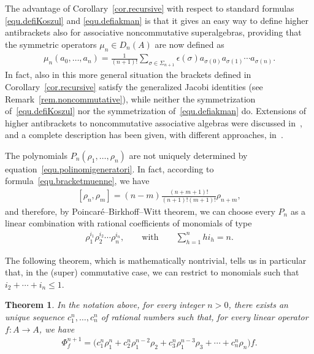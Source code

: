 \documentclass[pdftex]{sigma}
\numberwithin{equation}{section}
\newtheorem{Theorem}{Theorem}[section]
\begin{document}
The advantage of Corollary~\ref{cor.recursive} with respect to standard formulas \eqref{equ.defiKoszul} and
\eqref{equ.defiakman} is that it gives an easy way to def\/ine higher antibrackets
also for associative noncommutative superalgebras, providing that the symmetric operators $\mu_n\in D_n(A)$ are now def\/ined as
\begin{gather*} \mu_n(a_0,\ldots,a_n)=\frac{1}{(n+1)!}\sum_{\sigma\in \Sigma_{n+1}}\epsilon(\sigma)
a_{\sigma(0)}a_{\sigma(1)}\cdots a_{\sigma(n)} .\end{gather*}
In fact, also in this more general situation the brackets def\/ined in Corollary~\ref{cor.recursive}
satisfy the generalized Jacobi identities (see Remark~\ref{rem.noncommutative}),
while neither the symmetrization of~\eqref{equ.defiKoszul} nor the symmetrization of~\eqref{equ.defiakman} do. Extensions of higher antibrackets to noncommutative associative algebras were discussed in~\cite{alfaro,BM}, and a complete description has been given, with dif\/ferent approaches, in~\cite{derived,kapranovbrackets,Bering,intrinsic}.

The polynomials $P_n(\rho_1,\ldots,\rho_n)$ are not uniquely determined by equation~\eqref{equ.polinomigeneratori}. In fact, according to formula~\eqref{equ.bracketmuenne}, we have
\begin{gather}\label{equ.bracketrhoenne}
[\rho_n,\rho_m]=(n-m)\frac{(n+m+1)!}{(n+1)!(m+1)!}\rho_{n+m},\end{gather}
and therefore, by Poincar\'e--Birkhof\/f--Witt theorem, we can choose every $P_n$ as a linear combination with rational coef\/f\/icients of monomials of type
\begin{gather*} \rho_1^{i_1}\rho_2^{i_2}\cdots \rho_n^{i_n},\qquad \text{with}\qquad\sum_{h=1}^n hi_h=n .\end{gather*}

The following theorem, which is mathematically nontrivial, tells us in particular that, in the (super) commutative case, we can restrict to monomials such that $i_2+\cdots+i_n\le 1$.

\begin{Theorem}\label{thm.standardform}
In the notation above, for every integer $n>0$, there exists an unique sequence
$c_1^n,\ldots,c_n^n$ of rational numbers
such that, for every linear operator $f\colon A\to A$, we have
\begin{gather*}\Phi^{n+1}_f=\big(c_1^n\rho_1^n+c^n_2\rho_1^{n-2}\rho_2+c^n_3\rho_1^{n-3}\rho_3+\cdots+c^n_n\rho_n\big)f.\end{gather*}
\end{Theorem}
\end{document}
